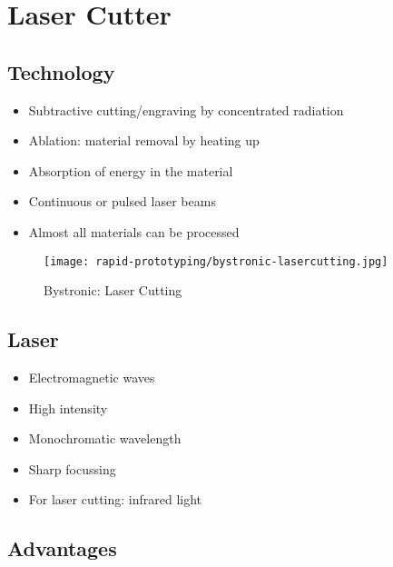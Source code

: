 \documentclass[aspectratio=169]{beamer}
\begin{document}
\section{Laser Cutter}

\subsection{Technology}

\begin{frame}
    \begin{itemize}
        \item Subtractive cutting/engraving by concentrated radiation
        \item Ablation: material removal by heating up
        \item Absorption of energy in the material
        \item Continuous or pulsed laser beams
        \item Almost all materials can be processed
    \end{itemize}
    \begin{figure}
        \texttt{[image: rapid-prototyping/bystronic-lasercutting.jpg]}
        \caption{Bystronic: Laser Cutting}
    \end{figure}
\end{frame}

\subsection{Laser}

\begin{frame}
    \begin{itemize}
        \item Electromagnetic waves
        \item High intensity
        \item Monochromatic wavelength
        \item Sharp focussing
        \item For laser cutting: infrared light
    \end{itemize}
\end{frame}

\subsection{Advantages}
\end{document}
